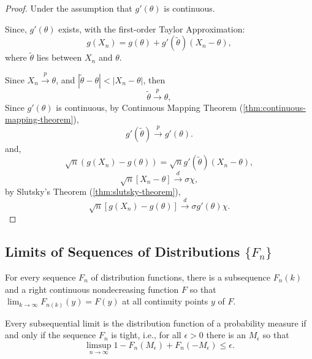 \begin{proof}
    Under the assumption that $g'(\theta)$ is continuous.

    Since, $g'(\theta)$ exists, with the first-order Taylor Approximation:
    \begin{equation*}
        g(X_n)=g(\theta)+g'(\tilde{\theta})(X_n-\theta),
    \end{equation*}
    where $\tilde{\theta}$ lies between $X_n$ and $\theta$.

    Since $X_n\stackrel{p}{\rightarrow}\theta$, and $|\tilde{\theta}-\theta|<|X_n-\theta|$, then
    \begin{equation*}
        \tilde{\theta}\stackrel{p}{\rightarrow}\theta,
    \end{equation*}
    Since $g'(\theta)$ is continuous, by Continuous Mapping Theorem (\ref{thm:continuous-mapping-theorem}),
    \begin{equation*}
        g'(\tilde{\theta})\stackrel{p}{\rightarrow}g'(\theta).
    \end{equation*}
    and,
    \begin{equation*}
        \sqrt{n}\left(g(X_n)-g(\theta)\right)=\sqrt{n}g'(\tilde{\theta})(X_n-\theta),
    \end{equation*}
    \begin{equation*}
        \sqrt{n}\left[X_{n}-\theta\right] \stackrel{d}{\rightarrow}\sigma\chi,
    \end{equation*}
    by Slutsky's Theorem (\ref{thm:slutsky-theorem}),
    \begin{equation*}
        \sqrt{n}\left[g\left(X_{n}\right)-g(\theta)\right] \stackrel{d}{\rightarrow} \sigma g'(\theta)\chi.
    \end{equation*}
\end{proof}

\subsection{Limits of Sequences of Distributions $\{F_n\}$}

\begin{theorem}
    For every sequence $F_{n}$ of distribution functions, there is a subsequence $F_{n}(k)$ and a right continuous nondecreasing function $F$ so that $\lim_{k\rightarrow\infty}F_{n(k)}(y)=F(y)$ at all continuity points $y$ of $F$.
\end{theorem}

\begin{theorem}
    Every subsequential limit is the distribution function of a probability measure if and only if the sequence $F_{n}$ is tight, i.e., for all $\epsilon>0$ there is an $M_{\epsilon}$ so that
    \begin{equation}
        \limsup_{n\rightarrow\infty}1-F_{n}\left(M_{\epsilon}\right)+F_{n}\left(-M_{\epsilon}\right)\leq\epsilon.
    \end{equation}
\end{theorem}

